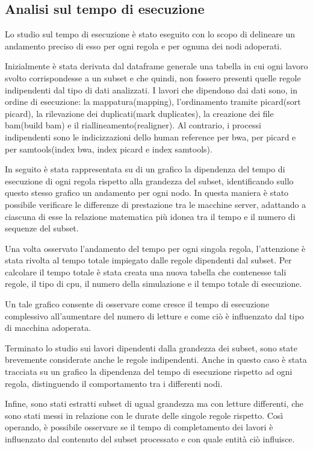 \subsection{Analisi sul tempo di esecuzione}
\label{sbsec:Te}
Lo studio sul tempo di esecuzione è stato eseguito con lo scopo di delineare un andamento preciso di esso per ogni regola e per ognuna dei nodi adoperati.  

Inizialmente è stata derivata dal dataframe generale una tabella in cui ogni lavoro svolto corrispondesse a un subset e che quindi, non fossero presenti quelle regole indipendenti dal tipo di dati analizzati.
I lavori che dipendono dai dati sono, in ordine di esecuzione: la mappatura(mapping), l'ordinamento tramite picard(sort picard), la rilevazione dei duplicati(mark duplicates), la creazione dei file bam(build bam) e il riallineamento(realigner).
Al contrario, i processi indipendenti sono le indicizzazioni dello human reference per bwa, per picard e per samtools(index bwa, index picard e index samtools). 

In seguito è stata rappresentata su di un grafico la dipendenza del tempo di esecuzione di ogni regola rispetto alla grandezza del subset, identificando sullo questo stesso grafico un andamento per ogni nodo. 
In questa maniera è stato possibile verificare le differenze di prestazione tra le macchine server, adattando a ciascuna di esse la relazione matematica più idonea tra il tempo e il numero di sequenze del subset.

Una volta osservato l'andamento del tempo per ogni singola regola, l'attenzione è stata rivolta al tempo totale impiegato dalle regole dipendenti dal subset.
Per calcolare il tempo totale è stata creata una nuova tabella che contenesse tali regole, il tipo di cpu, il numero della simulazione e il tempo totale di esecuzione.

Un tale grafico consente di osservare come cresce il tempo di esecuzione complessivo all'aumentare del numero di letture e come ciò è influenzato dal tipo di macchina adoperata.

Terminato lo studio sui lavori dipendenti dalla grandezza dei subset, sono state brevemente considerate anche le regole indipendenti.
Anche in questo caso è stata tracciata su un grafico la dipendenza del tempo di esecuzione rispetto ad ogni regola, distinguendo il comportamento tra i differenti nodi.  

Infine, sono stati estratti subset di ugual grandezza ma con letture differenti, che sono stati messi in relazione con le durate delle singole regole rispetto.
Così operando, è possibile osservare se il tempo di completamento dei lavori è influenzato dal contenuto del subset processato e con quale entità ciò influisce.

